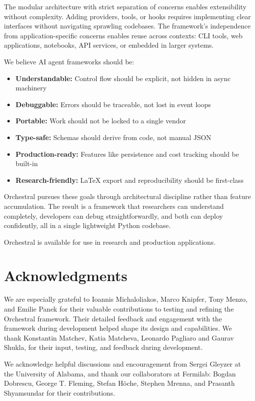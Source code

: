 \documentclass{article}
\begin{document}
The modular architecture with strict separation of concerns enables extensibility without complexity. Adding providers, tools, or hooks requires implementing clear interfaces without navigating sprawling codebases. The framework's independence from application-specific concerns enables reuse across contexts: CLI tools, web applications, notebooks, API services, or embedded in larger systems.

We believe AI agent frameworks should be:
\begin{itemize}
    \item \textbf{Understandable:} Control flow should be explicit, not hidden in async machinery
    \item \textbf{Debuggable:} Errors should be traceable, not lost in event loops
    \item \textbf{Portable:} Work should not be locked to a single vendor
    \item \textbf{Type-safe:} Schemas should derive from code, not manual JSON
    \item \textbf{Production-ready:} Features like persistence and cost tracking should be built-in
    \item \textbf{Research-friendly:} LaTeX export and reproducibility should be first-class
\end{itemize}

Orchestral pursues these goals through architectural discipline rather than feature accumulation. The result is a framework that researchers can understand completely, developers can debug straightforwardly, and both can deploy confidently, all in a single lightweight Python codebase.

Orchestral is available for use in research and production applications.

\section*{Acknowledgments}

We are especially grateful to Ioannis Michaloliakos, Marco Knipfer, Tony Menzo, and Emilie Panek for their valuable contributions to testing and refining the Orchestral framework. Their detailed feedback and engagement with the framework during development helped shape its design and capabilities.
We thank Konstantin Matchev, Katia Matcheva, Leonardo Pagliaro and Gaurav Shukla, for their input, testing, and feedback during development.

We acknowledge helpful discussions and encouragement from Sergei Gleyzer at the University of Alabama, and thank our collaborators at Fermilab: Bogdan Dobrescu, George T. Fleming, Stefan Höche, Stephen Mrenna, and Prasanth Shyamsundar for their contributions.

\printbibliography
\end{document}
